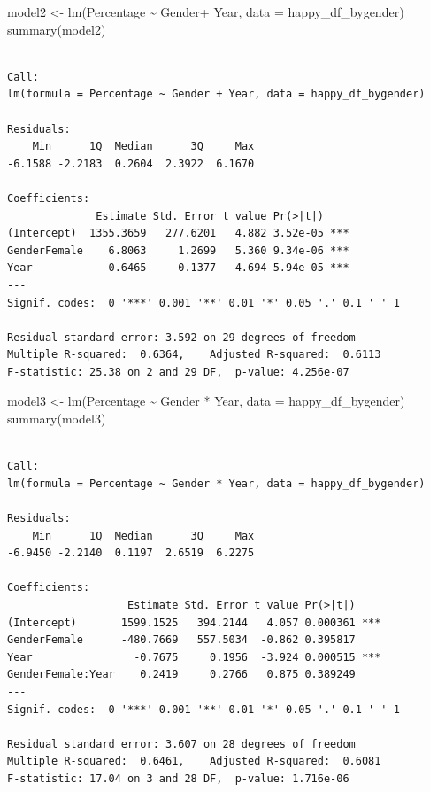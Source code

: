 \documentclass[
  11pt,
  a4paper,
  DIV=11,
  numbers=noendperiod]{scrartcl}
\newenvironment{Shaded}{\begin{snugshade}}{\end{snugshade}}
\newcommand{\AttributeTok}[1]{\textcolor[rgb]{0.40,0.45,0.13}{#1}}
\newcommand{\FunctionTok}[1]{\textcolor[rgb]{0.28,0.35,0.67}{#1}}
\newcommand{\NormalTok}[1]{\textcolor[rgb]{0.00,0.23,0.31}{#1}}
\newcommand{\OtherTok}[1]{\textcolor[rgb]{0.00,0.23,0.31}{#1}}
\newcommand{\SpecialCharTok}[1]{\textcolor[rgb]{0.37,0.37,0.37}{#1}}
\begin{document}
\begin{Shaded}
\begin{Highlighting}[]
\NormalTok{model2 }\OtherTok{\textless{}{-}} \FunctionTok{lm}\NormalTok{(Percentage }\SpecialCharTok{\textasciitilde{}}\NormalTok{ Gender}\SpecialCharTok{+}\NormalTok{ Year, }\AttributeTok{data =}\NormalTok{ happy\_df\_bygender)}
\FunctionTok{summary}\NormalTok{(model2)}
\end{Highlighting}
\end{Shaded}

\begin{verbatim}

Call:
lm(formula = Percentage ~ Gender + Year, data = happy_df_bygender)

Residuals:
    Min      1Q  Median      3Q     Max 
-6.1588 -2.2183  0.2604  2.3922  6.1670 

Coefficients:
              Estimate Std. Error t value Pr(>|t|)    
(Intercept)  1355.3659   277.6201   4.882 3.52e-05 ***
GenderFemale    6.8063     1.2699   5.360 9.34e-06 ***
Year           -0.6465     0.1377  -4.694 5.94e-05 ***
---
Signif. codes:  0 '***' 0.001 '**' 0.01 '*' 0.05 '.' 0.1 ' ' 1

Residual standard error: 3.592 on 29 degrees of freedom
Multiple R-squared:  0.6364,    Adjusted R-squared:  0.6113 
F-statistic: 25.38 on 2 and 29 DF,  p-value: 4.256e-07
\end{verbatim}

\begin{Shaded}
\begin{Highlighting}[]
\NormalTok{model3 }\OtherTok{\textless{}{-}} \FunctionTok{lm}\NormalTok{(Percentage }\SpecialCharTok{\textasciitilde{}}\NormalTok{ Gender }\SpecialCharTok{*}\NormalTok{ Year, }\AttributeTok{data =}\NormalTok{ happy\_df\_bygender)}
\FunctionTok{summary}\NormalTok{(model3)}
\end{Highlighting}
\end{Shaded}

\begin{verbatim}

Call:
lm(formula = Percentage ~ Gender * Year, data = happy_df_bygender)

Residuals:
    Min      1Q  Median      3Q     Max 
-6.9450 -2.2140  0.1197  2.6519  6.2275 

Coefficients:
                   Estimate Std. Error t value Pr(>|t|)    
(Intercept)       1599.1525   394.2144   4.057 0.000361 ***
GenderFemale      -480.7669   557.5034  -0.862 0.395817    
Year                -0.7675     0.1956  -3.924 0.000515 ***
GenderFemale:Year    0.2419     0.2766   0.875 0.389249    
---
Signif. codes:  0 '***' 0.001 '**' 0.01 '*' 0.05 '.' 0.1 ' ' 1

Residual standard error: 3.607 on 28 degrees of freedom
Multiple R-squared:  0.6461,    Adjusted R-squared:  0.6081 
F-statistic: 17.04 on 3 and 28 DF,  p-value: 1.716e-06
\end{verbatim}
\end{document}
